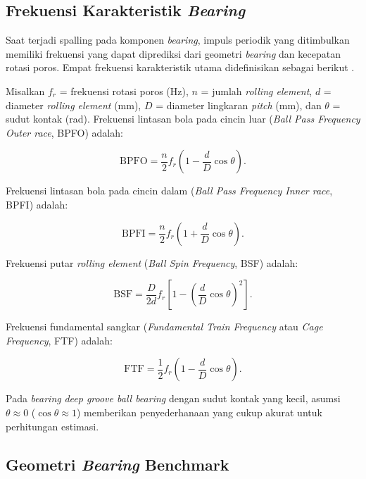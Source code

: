 \subsection{Frekuensi Karakteristik \emph{Bearing}}
\label{subsec:bab3_bpfx}

Saat terjadi spalling pada komponen \emph{bearing}, impuls periodik yang ditimbulkan
memiliki frekuensi yang dapat diprediksi dari geometri \emph{bearing} dan kecepatan
rotasi poros. Empat frekuensi karakteristik utama didefinisikan sebagai
berikut .

Misalkan $f_r$ = frekuensi rotasi poros (Hz), $n$ = jumlah \emph{rolling element},
$d$ = diameter \emph{rolling element} (mm), $D$ = diameter lingkaran \emph{pitch}
(mm), dan $\theta$ = sudut kontak (rad). Frekuensi lintasan bola pada cincin
luar (\emph{Ball Pass Frequency Outer race}, BPFO) adalah:

\begin{equation}\label{eq:bab3_bpfo}
  \text{BPFO} = \frac{n}{2} f_r \left(1 - \frac{d}{D}\cos\theta\right).
\end{equation}

Frekuensi lintasan bola pada cincin dalam (\emph{Ball Pass Frequency Inner
race}, BPFI) adalah:

\begin{equation}\label{eq:bab3_bpfi}
  \text{BPFI} = \frac{n}{2} f_r \left(1 + \frac{d}{D}\cos\theta\right).
\end{equation}

Frekuensi putar \emph{rolling element} (\emph{Ball Spin Frequency}, BSF) adalah:

\begin{equation}\label{eq:bab3_bsf}
  \text{BSF} = \frac{D}{2d} f_r \left[1 - \left(\frac{d}{D}\cos\theta\right)^2\right].
\end{equation}

Frekuensi fundamental sangkar (\emph{Fundamental Train Frequency} atau
\emph{Cage Frequency}, FTF) adalah:

\begin{equation}\label{eq:bab3_ftf}
  \text{FTF} = \frac{1}{2} f_r \left(1 - \frac{d}{D}\cos\theta\right).
\end{equation}

Pada \emph{bearing} \emph{deep groove ball bearing} dengan sudut kontak yang kecil,
asumsi $\theta \approx 0$ ($\cos\theta \approx 1$) memberikan penyederhanaan
yang cukup akurat untuk perhitungan estimasi.

\subsection{Geometri \emph{Bearing} Benchmark}
\label{subsec:bab3_geometri_benchmark}

